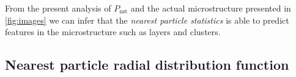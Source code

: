 From the present analysis of $P_\text{nst}$ and the actual microstructure presented in \ref{fig:images} we can infer that the \textit{nearest particle statistics} is able to predict features in the microstructure such as layers and clusters. 


\subsection{Nearest particle radial distribution function }

